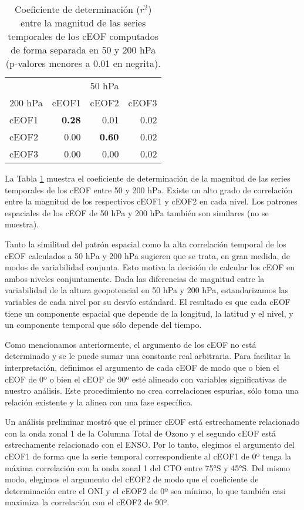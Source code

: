 \documentclass[12pt,oneside]{reedthesis}
\begin{document}
\begin{table}

\caption{\label{tab:corr-ceof-splitted}Coeficiente de determinación (\(r^2\)) entre la magnitud de las series temporales de los cEOF computados de forma separada en 50 y 200 hPa (p-valores menores a 0.01 en negrita).}
\centering
\begin{tabular}[t]{l>{}r>{}r>{}r}
\toprule
\multicolumn{1}{c}{} & \multicolumn{3}{c}{50 hPa} \\
\cmidrule(l{3pt}r{3pt}){2-4}
200 hPa & cEOF1 & cEOF2 & cEOF3\\
\midrule
cEOF1 & \textbf{0.28} & 0.01 & 0.02\\
cEOF2 & 0.00 & \textbf{0.60} & 0.02\\
cEOF3 & 0.00 & 0.00 & 0.02\\
\bottomrule
\end{tabular}
\end{table}
La Tabla \ref{tab:corr-ceof-splitted} muestra el coeficiente de determinación de la magnitud de las series temporales de los cEOF entre 50 y 200 hPa.
Existe un alto grado de correlación entre la magnitud de los respectivos cEOF1 y cEOF2 en cada nivel.
Los patrones espaciales de los cEOF de 50 hPa y 200 hPa también son similares (no se muestra).

Tanto la similitud del patrón espacial como la alta correlación temporal de los cEOF calculados a 50 hPa y 200 hPa sugieren que se trata, en gran medida, de modos de variabilidad conjunta.
Esto motiva la decisión de calcular los cEOF en ambos niveles conjuntamente.
Dada las diferencias de magnitud entre la variabilidad de la altura geopotencial en 50 hPa y 200 hPa, estandarizamos las variables de cada nivel por su desvío estándard.
El resultado es que cada cEOF tiene un componente espacial que depende de la longitud, la latitud y el nivel, y un componente temporal que sólo depende del tiempo.

Como mencionamos anteriormente, el argumento de los cEOF no está determinado y se le puede sumar una constante real arbitraria.
Para facilitar la interpretación, definimos el argumento de cada cEOF de modo que o bien el cEOF de 0º o bien el cEOF de 90º esté alineado con variables significativas de nuestro análisis.
Este procedimiento no crea correlaciones espurias, sólo toma una relación existente y la alinea con una fase específica.

Un análisis preliminar mostró que el primer cEOF está estrechamente relacionado con la onda zonal 1 de la Columna Total de Ozono y el segundo cEOF está estrechamente relacionado con el ENSO.
Por lo tanto, elegimos el argumento del cEOF1 de forma que la serie temporal correspondiente al cEOF1 de 0º tenga la máxima correlación con la onda zonal 1 del CTO entre 75°S y 45°S.
Del mismo modo, elegimos el argumento del cEOF2 de modo que el coeficiente de determinación entre el ONI y el cEOF2 de 0º sea mínimo, lo que también casi maximiza la correlación con el cEOF2 de 90º.
\end{document}
